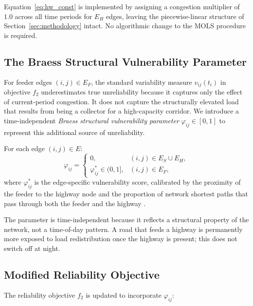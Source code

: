 \begin{remark}
Equation~\eqref{eq:hw_const} is implemented by assigning a
congestion multiplier of $1.0$ across all time periods for $E_H$ edges,
leaving the piecewise-linear structure of Section~\ref{sec:methodology}
intact. No algorithmic change to the MOLS procedure is required.
\end{remark}

\subsection{The Braess Structural Vulnerability Parameter}
\label{subsec:phi}

For feeder edges $(i,j)\in E_F$, the standard variability measure
$v_{ij}(t_i)$ in objective $f_2$ underestimates true unreliability
because it captures only the effect of current-period congestion. It does
not capture the structurally elevated load that results from being a
collector for a high-capacity corridor. We introduce a time-independent
\textit{Braess structural vulnerability parameter} $\varphi_{ij}\in
[0,1]$ to represent this additional source of unreliability.

\begin{definition}
\label{def:phi}
For each edge $(i,j)\in E$:
\[
  \varphi_{ij} =
  \begin{cases}
    0, & (i,j)\in E_S\cup E_H, \\[4pt]
    \varphi_{ij}^{*}\in(0,1], & (i,j)\in E_F,
  \end{cases}
\]
where $\varphi_{ij}^{*}$ is the edge-specific vulnerability score,
calibrated by the proximity of the feeder to the highway node and
the proportion of network shortest paths that pass through both
the feeder and the highway \cite{6,11}.
\end{definition}

The parameter is time-independent because it reflects a structural
property of the network, not a time-of-day pattern. A road that feeds a
highway is permanently more exposed to load redistribution once the
highway is present; this does not switch off at night.

\subsection{Modified Reliability Objective}
\label{subsec:f2_modified}

The reliability objective $f_2$ is updated to incorporate
$\varphi_{ij}$:

